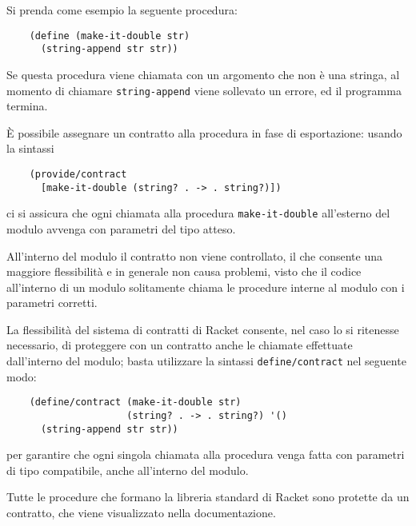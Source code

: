 Si prenda come esempio la seguente procedura:

\begin{lstlisting}
    (define (make-it-double str)
      (string-append str str))
\end{lstlisting}

Se questa procedura viene chiamata con un argomento che non \`e una
stringa, al momento di chiamare \lstinline{string-append} viene sollevato
un errore, ed il programma termina.

\`E possibile assegnare un contratto alla procedura in fase di
esportazione: usando la sintassi

\begin{lstlisting}
    (provide/contract
      [make-it-double (string? . -> . string?)])
\end{lstlisting}

ci si assicura che ogni chiamata alla procedura
\lstinline{make-it-double} all'esterno del modulo avvenga con parametri
del tipo atteso.

All'interno del modulo il contratto non viene controllato, il che
consente una maggiore flessibilit\`a e in generale non causa problemi,
visto che il codice all'interno di un modulo solitamente chiama le
procedure interne al modulo con i parametri corretti.

La flessibilit\`a del sistema di contratti di Racket consente, nel
caso lo si ritenesse necessario, di proteggere con un contratto anche
le chiamate effettuate dall'interno del modulo; basta utilizzare la
sintassi \lstinline{define/contract} nel seguente modo:

\begin{lstlisting}
    (define/contract (make-it-double str)
                     (string? . -> . string?) '()
      (string-append str str))
\end{lstlisting}

per garantire che ogni singola chiamata alla procedura venga fatta con
parametri di tipo compatibile, anche all'interno del modulo.

Tutte le procedure che formano la libreria standard di Racket sono
protette da un contratto, che viene visualizzato nella documentazione.
